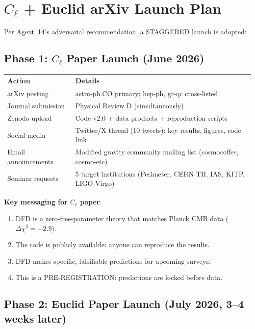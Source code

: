 \documentclass[11pt,a4paper]{article}
\begin{document}
\section{$C_\ell$ + Euclid arXiv Launch Plan}

Per Agent~14's adversarial recommendation, a STAGGERED launch is adopted:

\subsection{Phase 1: $C_\ell$ Paper Launch (June 2026)}

\begin{center}
\begin{tabular}{lp{8cm}}
\toprule
\textbf{Action} & \textbf{Details} \\
\midrule
arXiv posting & astro-ph.CO primary; hep-ph, gr-qc cross-listed \\
Journal submission & Physical Review D (simultaneously) \\
Zenodo upload & Code v2.0 + data products + reproduction scripts \\
Social media & Twitter/X thread (10 tweets): key results, figures, code link \\
Email announcements & Modified gravity community mailing list (cosmocoffee, cosmo-etc) \\
Seminar requests & 5 target institutions (Perimeter, CERN TH, IAS, KITP, LIGO-Virgo) \\
\bottomrule
\end{tabular}
\end{center}

\textbf{Key messaging for $C_\ell$ paper}:
\begin{enumerate}
\item DFD is a zero-free-parameter theory that matches Planck CMB data ($\Delta\chi^2 = -2.9$).
\item The code is publicly available: anyone can reproduce the results.
\item DFD makes specific, falsifiable predictions for upcoming surveys.
\item This is a PRE-REGISTRATION: predictions are locked before data.
\end{enumerate}

\subsection{Phase 2: Euclid Paper Launch (July 2026, 3--4 weeks later)}
\end{document}
